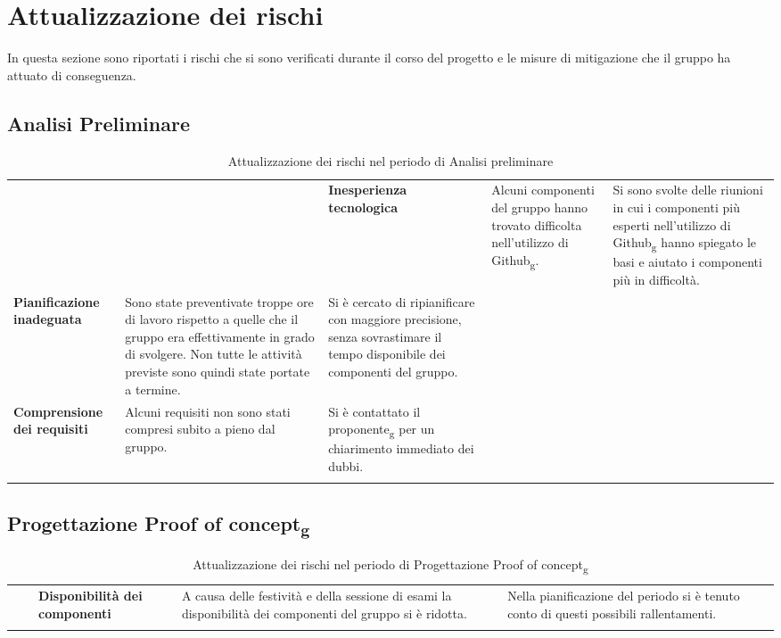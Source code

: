 \section{Attualizzazione dei rischi}
In questa sezione sono riportati i rischi che si sono verificati durante il corso del progetto e 
le misure di mitigazione che il gruppo ha attuato di conseguenza.
\subsection{Analisi Preliminare}
\begin{longtable}{ 
	>{\centering}M{0.20\textwidth} 
	>{\raggedright}M{0.30\textwidth}
	>{\raggedright}M{0.40\textwidth}
	}
	\rowcolorhead
	\centering 
	 &	
	 &
	\endfirsthead	
	\endhead
	
	\textbf{Inesperienza tecnologica} & 
    Alcuni componenti del gruppo hanno trovato difficolta nell'utilizzo di Github\textsubscript{g}. & 
    Si sono svolte delle riunioni in cui i componenti più esperti nell'utilizzo di Github\textsubscript{g} 
    hanno spiegato le basi e aiutato i componenti più in difficoltà.  \tabularnewline
    \textbf{Pianificazione inadeguata} & Sono state preventivate troppe ore di 
    lavoro rispetto a quelle che il gruppo era effettivamente in grado di svolgere. Non tutte le 
    attività previste sono quindi state portate a termine.  & 
    Si è cercato di ripianificare con maggiore precisione, senza sovrastimare il tempo disponibile dei 
    componenti del gruppo. \tabularnewline
    \textbf{Comprensione dei requisiti} & Alcuni requisiti non sono stati compresi subito a pieno dal gruppo.  & 
    Si è contattato il proponente\textsubscript{g} per un chiarimento immediato dei dubbi. \tabularnewline
	\captionline \caption{Attualizzazione dei rischi nel periodo di Analisi preliminare}
\end{longtable}

\subsection{Progettazione Proof of concept\textsubscript{g}}
\begin{longtable}{ 
	>{\centering}M{0.20\textwidth} 
	>{\raggedright}M{0.30\textwidth}
	>{\raggedright}M{0.40\textwidth}
	}
	\rowcolorhead
	\centering 
	 &	
	 &
	\endfirsthead	
	\endhead
	
	\textbf{Disponibilità dei componenti} & 
    A causa delle festività e della sessione di esami la disponibilità dei componenti del gruppo 
    si è ridotta. & 
    Nella pianificazione del periodo si è tenuto conto di questi possibili rallentamenti.  \tabularnewline
	\captionline \caption{Attualizzazione dei rischi nel periodo di Progettazione Proof of concept\textsubscript{g}}
\end{longtable}

